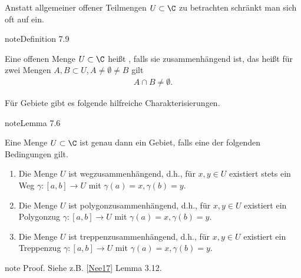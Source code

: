 \documentclass[letterpaper,10pt,german]{jupyterBook}
\begin{document}
\sphinxAtStartPar
Anstatt allgemeiner offener Teilmengen \(U\subset\C\) zu betrachten schränkt man sich oft auf  ein.
\label{complexanalysis/kurvenintegrale:definition-13}
\begin{sphinxadmonition}{note}{Definition 7.9}



\sphinxAtStartPar
Eine offenen Menge \(U\subset\C\) heißt , falls sie zusammenhängend ist, das heißt für zwei Mengen \(A,B\subset U,A\neq\emptyset\neq B\) gilt
\begin{equation*}
\begin{split}A\cap B \neq \emptyset.\end{split}
\end{equation*}\end{sphinxadmonition}

\sphinxAtStartPar
Für Gebiete gibt es folgende hilfreiche Charakterisierungen.
\label{complexanalysis/kurvenintegrale:lemma-14}
\begin{sphinxadmonition}{note}{Lemma 7.6}



\sphinxAtStartPar
Eine Menge \(U\subset\C\) ist genau dann ein Gebiet, falls eine der folgenden Bedingungen gilt.
\begin{enumerate}
%
\item {} 
\sphinxAtStartPar
Die Menge \(U\) ist wegzusammenhängend, d.h., für \(x,y\in U\) existiert stets ein Weg \(\gamma:[a,b]\to U\) mit \(\gamma(a)=x,\gamma(b)=y\).

\item {} 
\sphinxAtStartPar
Die Menge \(U\) ist polygonzusammenhängend, d.h., für \(x,y\in U\) existiert ein Polygonzug \(\gamma:[a,b]\to U\) mit \(\gamma(a)=x,\gamma(b)=y\).

\item {} 
\sphinxAtStartPar
Die Menge \(U\) ist treppenzusammenhängend, d.h., für \(x,y\in U\) existiert ein Treppenzug \(\gamma:[a,b]\to U\) mit \(\gamma(a)=x,\gamma(b)=y\).

\end{enumerate}
\end{sphinxadmonition}

\begin{sphinxadmonition}{note}
\sphinxAtStartPar
Proof. Siehe z.B. {[}\hyperlink{cite.references:id13}{Nee17}{]} Lemma 3.12.
\end{sphinxadmonition}
\end{document}
